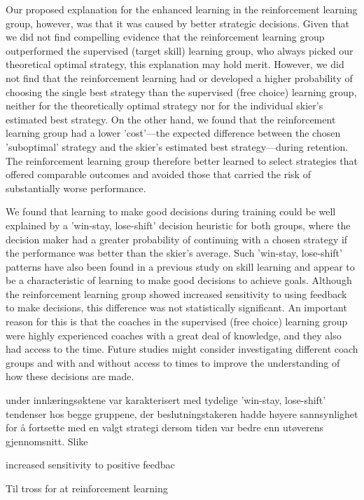 \documentclass[pdflatex,sn-mathphys-num]{sn-jnl}%
\theoremstyle{thmstyleone}%
\theoremstyle{thmstyletwo}%
\theoremstyle{thmstylethree}%
\begin{document}
Our proposed explanation for the enhanced learning in the reinforcement learning group, however, was that it was caused by better strategic decisions. Given that we did not find compelling evidence that the reinforcement learning group outperformed the supervised (target skill) learning group, who always picked our theoretical optimal strategy, this explanation may hold merit. However, we did not find that the reinforcement learning had or developed a higher probability of choosing the single best strategy than the supervised (free choice) learning group, neither for the theoretically optimal strategy nor for the individual skier's estimated best strategy. On the other hand, we found that the reinforcement learning group had a lower 'cost'—the expected difference between the chosen 'suboptimal' strategy and the skier's estimated best strategy—during retention. The reinforcement learning group therefore better learned to select strategies that offered comparable outcomes and avoided those that carried the risk of substantially worse performance.

We found that learning to make good decisions during training could be well explained by a 'win-stay, lose-shift' decision heuristic for both groups, where the decision maker had a greater probability of continuing with a chosen strategy if the performance was better than the skier's average. Such 'win-stay, lose-shift' patterns have also been found in a previous study on skill learning and appear to be a characteristic of learning to make good decisions to achieve goals. Although the reinforcement learning group showed increased sensitivity to using feedback to make decisions, this difference was not statistically significant. An important reason for this is that the coaches in the supervised (free choice) learning group were highly experienced coaches with a great deal of knowledge, and they also had access to the time. Future studies might consider investigating different coach groups and with and without access to times to improve the understanding of how these decisions are made.



under innlæringsøktene var karakterisert med tydelige 'win-stay, lose-shift' tendenser hos begge gruppene, der beslutningstakeren hadde høyere sannsynlighet for å fortsette med en valgt strategi dersom tiden var bedre enn utøverens gjennomsnitt. Slike 

 increased sensitivity to positive feedbac


Til tross for at reinforcement learning 
\end{document}
